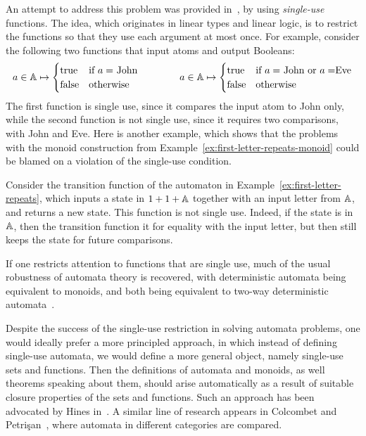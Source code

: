 An attempt to address this problem was provided in~\cite{stefansk-msc,stefanski-phd,bojanczykstefanski2020}, by using \emph{single-use} functions. The idea, which originates in linear types and linear logic,  is to restrict the functions so that they use each argument at most once. For example, consider the following two functions that input atoms and output Booleans:
\begin{align*}
a \in \mathbb A \mapsto 
\begin{cases}
    \text{true} & \text{if $a=$ John}\\
    \text{false} & \text{otherwise}
\end{cases}
\qquad \qquad 
a \in \mathbb A \mapsto 
\begin{cases}
    \text{true} & \text{if $a=$ John or $a = $Eve}\\
    \text{false} & \text{otherwise}
\end{cases}
\end{align*}
The first function is single use, since it compares the input atom to John only, while the second function is not single use, since it requires two comparisons, with John and Eve. Here is another example, which shows that the problems with the monoid construction from Example~\ref{ex:first-letter-repeats-monoid} could be blamed on a violation of the single-use condition.
\begin{example}
    Consider  the transition function of the automaton in Example~\ref{ex:first-letter-repeats}, which inputs a state in $1 + 1 + \mathbb A$ together with an input letter from $\mathbb A$, and returns a new state.  This function is not single use. Indeed, if the state is in $\mathbb A$, then the transition function it for equality with the input letter, but then still keeps the state for future comparisons. 
\end{example}

If one restricts attention to functions that are single use, much of the usual robustness of automata theory is recovered, with deterministic automata being equivalent to monoids, and both being equivalent to two-way deterministic automata~\cite{bojanczykstefanski2020}.

Despite the success of the single-use restriction in solving automata problems, one would ideally prefer a more principled approach, in which instead of defining single-use automata, we would define a more general object, namely single-use sets and functions. Then the definitions of  automata and monoids, as well theorems speaking about them, should arise automatically as a result of suitable closure properties of the sets and functions. Such an approach has been advocated by Hines in~\cite{hines2003categorical}. A similar line of research  appears in Colcombet and Petrişan~\cite{colcombet2020automata}, where automata in different categories are compared.


